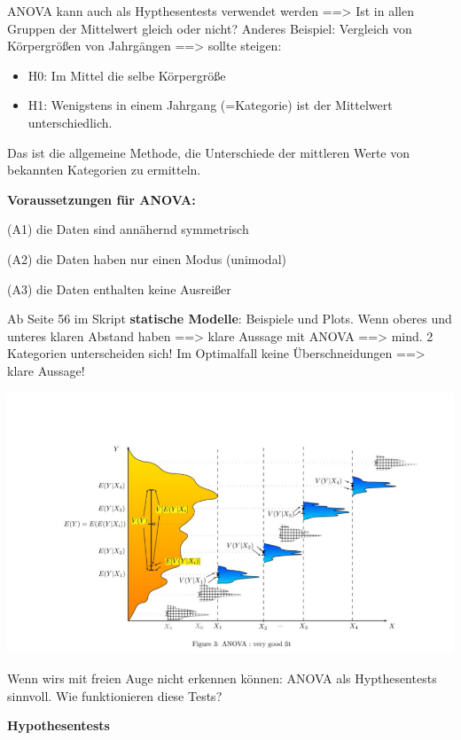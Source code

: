 \documentclass[
]{article}
\providecommand{\tightlist}{%
  \setlength{\itemsep}{0pt}\setlength{\parskip}{0pt}}
\begin{document}
ANOVA kann auch als Hypthesentests verwendet werden ==\textgreater{} Ist
in allen Gruppen der Mittelwert gleich oder nicht? Anderes Beispiel:
Vergleich von Körpergrößen von Jahrgängen ==\textgreater{} sollte
steigen:

\begin{itemize}
\tightlist
\item
  H0: Im Mittel die selbe Körpergröße
\item
  H1: Wenigstens in einem Jahrgang (=Kategorie) ist der Mittelwert
  unterschiedlich.
\end{itemize}

Das ist die allgemeine Methode, die Unterschiede der mittleren Werte von
bekannten Kategorien zu ermitteln.

\tcolorbox

\textbf{Voraussetzungen für ANOVA:}

(A1) die Daten sind annähernd symmetrisch

(A2) die Daten haben nur einen Modus (unimodal)

(A3) die Daten enthalten keine Ausreißer \endtcolorbox

Ab Seite 56 im Skript \textbf{statische Modelle}: Beispiele und Plots.
Wenn oberes und unteres klaren Abstand haben ==\textgreater{} klare
Aussage mit ANOVA ==\textgreater{} mind. 2 Kategorien unterscheiden
sich! Im Optimalfall keine Überschneidungen ==\textgreater{} klare
Aussage!

\includegraphics[width=15cm, center]{Fig8}

Wenn wirs mit freien Auge nicht erkennen können: ANOVA als
Hypthesentests sinnvoll. Wie funktionieren diese Tests?

\tcolorbox

\textbf{Hypothesentests}
\end{document}
